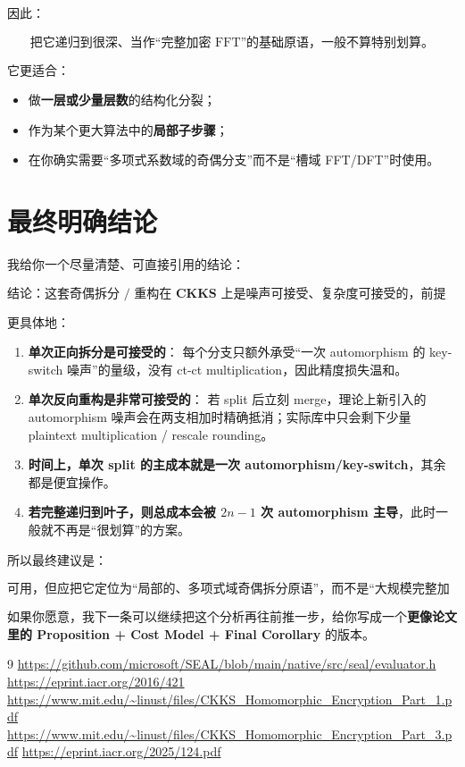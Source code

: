 \documentclass{article}
\begin{document}
因此：

\[
\boxed{
\text{把它递归到很深、当作“完整加密 FFT”的基础原语，一般不算特别划算。}
}
\]

它更适合：

\begin{itemize}
    \item 做\textbf{一层或少量层数}的结构化分裂；
    \item 作为某个更大算法中的\textbf{局部子步骤}；
    \item 在你确实需要“多项式系数域的奇偶分支”而不是“槽域 FFT/DFT”时使用。
\end{itemize}

\section{最终明确结论}

我给你一个尽量清楚、可直接引用的结论：

\[
\boxed{
\textbf{结论：这套奇偶拆分 / 重构在 CKKS 上是噪声可接受、复杂度可接受的，前提是把它当作单次或少量层数的局部原语来用。}
}
\]

更具体地：

\begin{enumerate}
    \item \textbf{单次正向拆分是可接受的}：
    每个分支只额外承受“一次 automorphism 的 key-switch 噪声”的量级，没有 ct-ct multiplication，因此精度损失温和。
    
    \item \textbf{单次反向重构是非常可接受的}：
    若 split 后立刻 merge，理论上新引入的 automorphism 噪声会在两支相加时精确抵消；实际库中只会剩下少量 plaintext multiplication / rescale rounding。
    
    \item \textbf{时间上，单次 split 的主成本就是一次 automorphism/key-switch}，其余都是便宜操作。
    
    \item \textbf{若完整递归到叶子，则总成本会被 \(2n-1\) 次 automorphism 主导}，此时一般就不再是“很划算”的方案。
\end{enumerate}

所以最终建议是：

\[
\boxed{
\textbf{可用，但应把它定位为“局部的、多项式域奇偶拆分原语”，而不是“大规模完整加密 FFT”的默认实现方式。}
}
\]

如果你愿意，我下一条可以继续把这个分析再往前推一步，给你写成一个\textbf{更像论文里的 Proposition + Cost Model + Final Corollary} 的版本。

\begin{thebibliography}{9}
     \url{https://github.com/microsoft/SEAL/blob/main/native/src/seal/evaluator.h}
     \url{https://eprint.iacr.org/2016/421}
     \url{https://www.mit.edu/~linust/files/CKKS_Homomorphic_Encryption_Part_1.pdf}
     \url{https://www.mit.edu/~linust/files/CKKS_Homomorphic_Encryption_Part_3.pdf}
     \url{https://eprint.iacr.org/2025/124.pdf}
\end{thebibliography}
\end{document}

